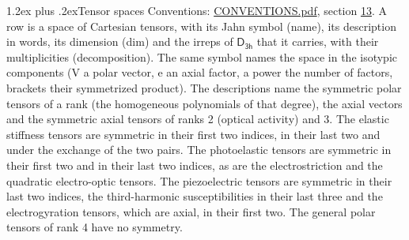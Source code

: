 \documentclass[10pt,a4paper]{article}
\makeatletter
\renewcommand\section{\@startsection{section}{1}{\z@}{-3ex plus -1ex minus -.2ex}%
  {1.2ex plus .2ex}{\normalfont\large\sffamily\bfseries\color{parttitle}}}
\numberwithin{equation}{section}
\newcommand{\grp}[1]{\mathsf{#1}}
\makeatother
\begin{document}
\section{Tensor spaces}\label{s:tensor_spaces}
Conventions: \href{../../CONVENTIONS.pdf}{CONVENTIONS.pdf}, section \href{../../CONVENTIONS.pdf\#conv.13}{13}.
\leavevmode\label{n:head.name}\label{n:head.description}\label{n:head.dim}\label{n:head.decomposition}A row is a space of Cartesian tensors, with its Jahn symbol (name), its description in words, its dimension (dim) and the irreps of $\grp{D_{3h}}$ that it carries, with their multiplicities (decomposition). \label{n:label.jahn}The same symbol names the space in the isotypic components (V a polar vector, e an axial factor, a power the number of factors, brackets their symmetrized product). The descriptions name the symmetric polar tensors of a rank (the homogeneous polynomials of that degree), the axial vectors and the symmetric axial tensors of ranks 2 (optical activity) and 3. The elastic stiffness tensors are symmetric in their first two indices, in their last two and under the exchange of the two pairs. The photoelastic tensors are symmetric in their first two and in their last two indices, as are the electrostriction and the quadratic electro-optic tensors. The piezoelectric tensors are symmetric in their last two indices, the third-harmonic susceptibilities in their last three and the electrogyration tensors, which are axial, in their first two. The general polar tensors of rank 4 have no symmetry.
\end{document}

